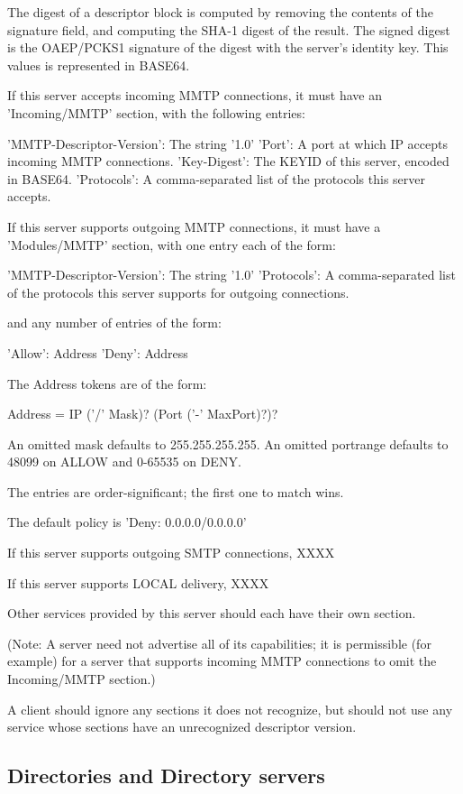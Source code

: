The digest of a descriptor block is computed by removing the contents
of the signature field, and computing the SHA-1 digest of
the result.  The signed digest is the OAEP/PCKS1 signature of the
digest with the server's identity key.  This values is
represented in BASE64.

If this server accepts incoming MMTP connections, it must have an
'Incoming/MMTP' section, with the following entries:

     'MMTP-Descriptor-Version': The string '1.0'
     'Port': A port at which IP accepts incoming MMTP connections.
     'Key-Digest': The KEYID of this server, encoded in BASE64.
     'Protocols': A comma-separated list of the protocols this
           server accepts.

If this server supports outgoing MMTP connections, it must have a
'Modules/MMTP' section, with one entry each of the form:

      'MMTP-Descriptor-Version': The string '1.0'
      'Protocols': A comma-separated list of the protocols this server
           supports for outgoing connections.

and any number of entries of the form:

      'Allow': Address
      'Deny': Address

The Address tokens are of the form:

   Address = IP ('/' Mask)? (Port ('-' MaxPort)?)?

An omitted mask defaults to 255.255.255.255.  An omitted portrange
defaults to 48099 on ALLOW and 0-65535 on DENY.

The entries are order-significant; the first one to match wins.

The default policy is 'Deny: 0.0.0.0/0.0.0.0'

If this server supports outgoing SMTP connections, XXXX

If this server supports LOCAL delivery, XXXX

Other services provided by this server should each have their own section.

(Note: A server need not advertise all of its capabilities; it is
permissible (for example) for a server that supports incoming MMTP
connections to omit the Incoming/MMTP section.)

A client should ignore any sections it does not recognize, but should
not use any service whose sections have an unrecognized descriptor
version.

\subsection{Directories and Directory servers}

